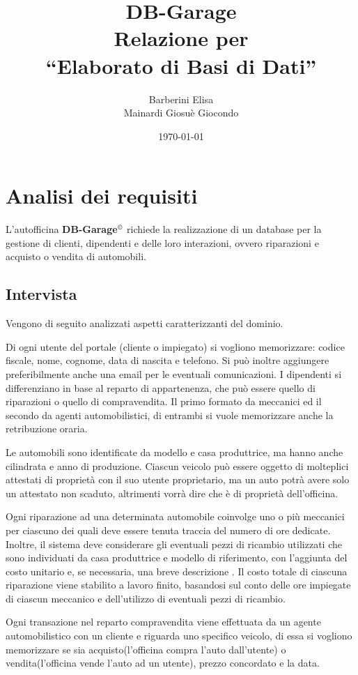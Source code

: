 \documentclass[a4paper,12pt]{report}
\title{\textbf{DB-Garage}\\Relazione per\\``Elaborato di Basi di Dati''}
\author{Barberini Elisa\\Mainardi Giosuè Giocondo}
\date{\today}
\begin{document}
\maketitle

\tableofcontents

\chapter{Analisi dei requisiti}
L'autofficina \textbf{DB-Garage}$^{\copyright}$ richiede la realizzazione di un database per la gestione di
%
clienti, dipendenti e delle loro interazioni, ovvero riparazioni e acquisto o vendita di automobili.

\section{Intervista}
Vengono di seguito analizzati aspetti caratterizzanti del dominio.

Di ogni utente del portale (cliente o impiegato) si vogliono memorizzare: codice fiscale, nome, cognome,
%
data di nascita e telefono. Si può inoltre aggiungere preferibilmente anche una email per le eventuali comunicazioni. 
%
I dipendenti si differenziano in base al reparto di appartenenza, che può essere quello di riparazioni o quello di compravendita.
%
Il primo formato da meccanici ed il secondo da agenti automobilistici, di entrambi si vuole memorizzare anche la retribuzione oraria.

Le automobili sono identificate da modello e casa produttrice, ma hanno anche cilindrata e anno di produzione.
%
Ciascun veicolo può essere oggetto di molteplici attestati di proprietà con il suo utente proprietario, 
%
ma un auto potrà avere solo un attestato non scaduto, altrimenti vorrà dire che è di proprietà dell'officina.

Ogni riparazione ad una determinata automobile coinvolge uno o più meccanici per ciascuno dei quali deve 
%
essere tenuta traccia del numero di ore dedicate.
%
Inoltre, il sistema deve considerare gli eventuali pezzi di ricambio utilizzati che sono individuati da 
%
casa produttrice e modello di riferimento, con l'aggiunta del costo unitario e, se necessaria, una breve descrizione .
%
Il costo totale di ciascuna riparazione viene stabilito a lavoro finito, basandosi sul conto delle ore 
%
impiegate di ciascun meccanico e dell’utilizzo di eventuali pezzi di ricambio.

Ogni transazione nel reparto compravendita viene effettuata da un agente automobilistico con un cliente 
%
e riguarda uno specifico veicolo, di essa si vogliono memorizzare se sia acquisto(l'officina compra l'auto 
%
dall'utente) o vendita(l'officina vende l'auto ad un utente), prezzo concordato e la data.
\end{document}
